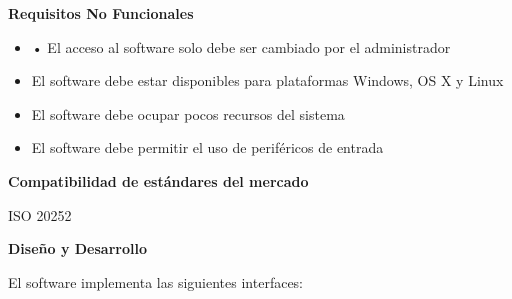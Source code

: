 \documentclass[10pt,a4paper]{article}
\begin{document}
\textbf{Requisitos No Funcionales}
\vspace{\baselineskip}
\begin{itemize}
\item •	El acceso al software solo debe ser cambiado por el administrador
\item El software debe estar disponibles para plataformas Windows, OS X y Linux
\item El software debe ocupar pocos recursos del sistema
\item El software debe permitir el uso de periféricos de entrada
\end{itemize}

\textbf{Compatibilidad de estándares del mercado}
\vspace{\baselineskip}

ISO 20252

\vspace{\baselineskip}
\textbf{Diseño y Desarrollo}
\vspace{\baselineskip}

El software implementa las siguientes interfaces:
\end{document}

